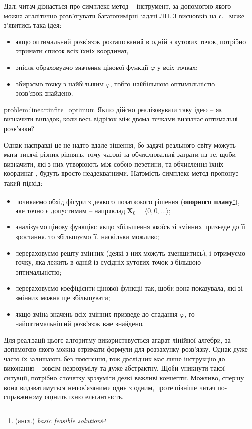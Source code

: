 \documentclass[\main/book.tex]{subfiles}
\begin{document}
Далі читач дізнається про симплекс-метод -- інструмент, за допомогою якого можна аналітично розв'язувати багатовимірні задачі ЛП. З висновків на с.~\pageref{conclusion:linear:optimal_solution} може з'явитись така ідея:

\begin{itemize}
 \item якщо оптимальний розв'язок розташований в одній з кутових точок, потрібно отримати список всіх їхніх координат;
 \item опісля обраховуємо значення цінової функції $\varphi$ у всіх точках;
 \item обираємо точку з найбільшим $\varphi$, тобто найбільшою оптимальністю -- розв'язок знайдено.
\end{itemize}

\begin{problem}{problem:linear:infite_optimum}
 Якщо дійсно реалізовувати таку ідею -- як визначити випадок, коли весь відрізок між двома точками визначає оптимальні розв'язки?
\end{problem}

Однак насправді це не надто вдале рішення, бо задачі \flqq{}реального світу\frqq{} можуть мати тисячі різних рівнянь, тому часові та обчислювальні затрати на те, щоби визначити, які з них утворюють між собою перетини, та обчислення їхніх координат
, будуть просто неадекватними. Натомість симплекс-метод пропонує такий підхід:

\begin{itemize}
 \item починаємо обхід фігури з деякого початкового рішення (\textbf{опорного плану}\footnote{(англ.) \textit{basic feasible solution}}), яке точно є допустимим -- наприклад $\mathbf{X}_0 = {\langle 0, 0, \ldots \rangle}$;
 \item аналізуємо цінову функцію: якщо збільшення якоїсь зі змінних призведе до її зростання, то збільшуємо її, наскільки можливо;
 \item перераховуємо решту змінних (деякі з них можуть зменшитись), і отримуємо точку, яка лежить в одній із сусідніх кутових точок з більшою оптимальністю;
 \item перераховуємо коефіцієнти цінової функції так, щоби вона показувала, які зі змінних можна ще збільшувати;
 \item якщо зміна значень всіх змінних призведе до спадання $\varphi$, то найоптимальніший розв'язок вже знайдено.
\end{itemize}

Для реалізації цього алгоритму використовується апарат лінійної алгебри, за допомогою якого можна отримати формули для розрахунку розв'язку. Однак дуже часто їх залишають без пояснення, тож дослідник має лише інструкцію до виконання -- зовсім незрозумілу та дуже абстрактну. Щоби уникнути такої ситуації, потрібно спочатку зрозуміти деякі важливі концепти. Можливо, спершу вони видаватимуться непов'язаними один з одним, проте пізніше читач по-справжньому оцінить їхню елегантність.
\end{document}
